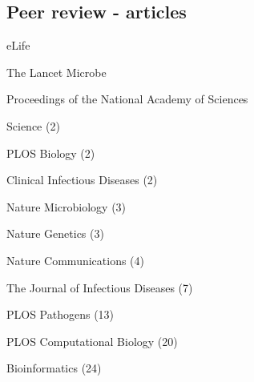 





\subsection {Peer review - articles}


\begin{cvitemize}
\item eLife
\item The Lancet Microbe
\item Proceedings of the National Academy of Sciences
\item Science (2)
\item PLOS Biology (2)
\item Clinical Infectious Diseases (2)
\item Nature Microbiology (3)
\item Nature Genetics (3)
\item Nature Communications (4)
\item The Journal of Infectious Diseases (7)
\item PLOS Pathogens (13)
\item PLOS Computational Biology (20)
\item Bioinformatics (24)
\end{cvitemize}
